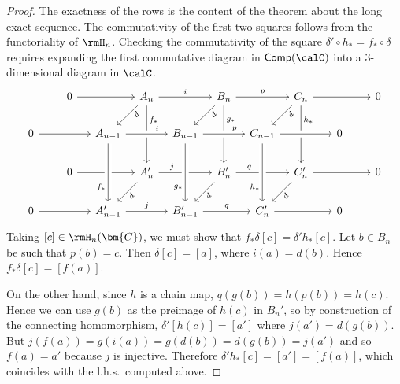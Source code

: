 \begin{proof}
     The exactness of the rows is the content of the theorem about the long exact sequence. The commutativity of the first two squares follows from the functoriality of $\rmH_n$. Checking the commutativity of the square $\delta'\circ h_\ast=f_\ast\circ \delta$ requires expanding the first commutative diagram in $\mathsf{Comp}(\calC)$ into a 3-dimensional diagram in $\calC$.
     \[
     \begin{tikzcd}[column sep={35,between origins}]
        &
        0 
        \ar{rr}
        & &
        A_n
        \ar{dl}[swap, sloped, near start]{d}
        \ar{rr}{i}
        \ar[]{dd}[near start]{f_\ast}
        & & B_n
        \ar{dd}[near start]{g_\ast}
        \ar{rr}{p}
        \ar{dl}[swap, sloped, near start]{d}
        & & C_n
        \ar{dd}[near start]{h_\ast}
        \ar{dl}[swap, sloped, near start]{d}
        \ar{rr}
        & &
        0
        \\
        0
        \ar{rr}
        & &
        A_{n-1}
        \ar[crossing over]{rr}[near end]{i}
        & & B_{n-1}
        \ar[crossing over]{rr}[near end]{p}
        & & C_{n-1}
        \ar[crossing over]{rr}
        & &
        0
        \\
        &
        0
        \ar{rr}
        & &
        A_n'
        \ar[near start]{rr}{j}
        \ar[sloped, swap]{dl}{d}
        & & B_n'
        \ar[near start]{rr}{q}
        \ar[sloped, swap]{dl}{d}
        & & C_n'
        \ar[sloped, swap]{dl}{d}
        \ar{rr}
        & &
        0
        \\
        0
        \ar{rr}
        & &
        A_{n-1}'
        \ar{rr}{j}
        \ar[crossing over, leftarrow, near start]{uu}{f_\ast}
        & & B_{n-1}'
        \ar{rr}{q}
        \ar[crossing over, leftarrow, near start]{uu}{g_\ast}
        & & C_n'
        \ar[crossing over, leftarrow, near start]{uu}{h_\ast}
        \ar{rr}
        & &
        0
        \end{tikzcd}
     \]
     Taking $[c]\in \rmH_n(\bm{C})$, we must show that $f_\ast\delta [c]=\delta ' h_\ast [c]$. Let $b\in B_n$ be such that $p(b)=c$. Then $\delta [c]=[a]$, where $i(a)=d(b)$. Hence $f_\ast \delta [c]=[f(a)]$. 
     
     On the other hand, since $h$ is a chain map, $q(g(b))=h(p(b))=h(c)$. Hence we can use $g(b)$ as the preimage of $h(c)$ in $B_n'$, so by construction of the connecting homomorphism, $\delta '[h(c)]=[a']$ where $j(a')=d(g(b))$. But $j(f(a))=g(i(a))=g(d(b))=d(g(b))=j(a')$ and so $f(a)=a'$ because $j$ is injective. Therefore $\delta'h_\ast [c]=[a']=[f(a)]$, which coincides with the l.h.s.\ computed above.
\end{proof}

